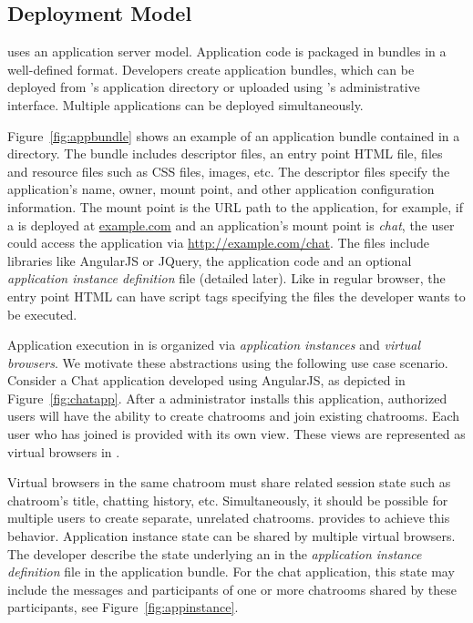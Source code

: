 \subsection{Deployment Model}
\label{sec:deploymodel}

\appbundlefig{}

\cb uses an application server model.  Application code is packaged in
bundles in a well-defined format.
Developers create application bundles, which can be deployed
from \cb's application directory or uploaded using \cb's administrative
interface.  Multiple applications can be deployed simultaneously.

Figure~\ref{fig:appbundle} shows an example of an \cb application bundle
contained in a directory.
The bundle includes descriptor files, an entry point HTML file,
\js files and resource files such as CSS files, images, etc.
The descriptor files specify the application's name, owner, mount point, and
other application configuration information.
The mount point is the URL path to the application, for example,
if a \cb is deployed at \url{example.com} and an application's mount point is
\emph{chat}, the user could access the application via \url{http://example.com/chat}.
The \js files include libraries like AngularJS or JQuery, 
the application code and an optional \emph{application instance definition}
file (detailed later).
Like in regular browser, the entry point HTML can have script tags
specifying the \js files the developer wants to be executed.

\chatappfig{}

\appinstancefig{}

%
Application execution in \cb is organized via \emph{application
instances} and \emph{virtual browsers}.  
We motivate these abstractions using the following use case scenario.
Consider a Chat application developed using
AngularJS, as depicted in Figure~\ref{fig:chatapp}. After a \cb administrator 
installs this application, authorized users will have the ability to
create chatrooms and join existing chatrooms.  Each user who has joined is
provided with its own view.
These views are represented as virtual browsers in \cb. 

Virtual browsers in the same chatroom must share related session state such
as chatroom's title, chatting history, etc. Simultaneously, it should be
possible for multiple users to create separate, unrelated chatrooms.
\cb provides \appins to achieve this behavior. Application instance state 
can be shared by multiple virtual browsers. The developer
describe the state underlying an \appins{} in the \emph{application instance
definition} file in the application bundle. For the chat application, this state
may include the messages and participants of one or more chatrooms shared
by these participants, see Figure~\ref{fig:appinstance}. 


